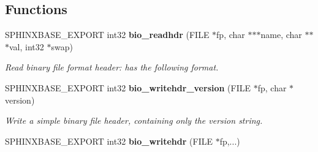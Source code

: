 \subsection*{Functions}
\begin{DoxyCompactItemize}
\item 
S\-P\-H\-I\-N\-X\-B\-A\-S\-E\-\_\-\-E\-X\-P\-O\-R\-T int32 {\bf bio\-\_\-readhdr} (F\-I\-L\-E $\ast$fp, char $\ast$$\ast$$\ast$name, char $\ast$$\ast$$\ast$val, int32 $\ast$swap)
\begin{DoxyCompactList}\small\item\em Read binary file format header\-: has the following format. \end{DoxyCompactList}\item 
S\-P\-H\-I\-N\-X\-B\-A\-S\-E\-\_\-\-E\-X\-P\-O\-R\-T int32 {\bf bio\-\_\-writehdr\-\_\-version} (F\-I\-L\-E $\ast$fp, char $\ast$version)
\begin{DoxyCompactList}\small\item\em Write a simple binary file header, containing only the version string. \end{DoxyCompactList}\item 
S\-P\-H\-I\-N\-X\-B\-A\-S\-E\-\_\-\-E\-X\-P\-O\-R\-T int32 {\bfseries bio\-\_\-writehdr} (F\-I\-L\-E $\ast$fp,...)\label{bio_8h_adc41fc6124fa3e52267c0a2c1036246f}


\end{DoxyCompactItemize}
